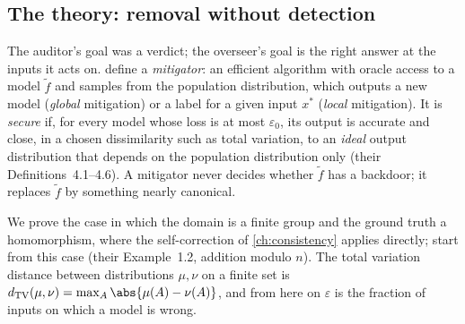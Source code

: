 \begin{refsection}
\section{The theory: removal without detection}\label{sec:backdoors:mitigation}

The auditor's goal was a verdict; the overseer's goal is the right answer at the inputs it acts on. \Textcite{GoldwasserEtAl2025} define a \emph{mitigator}: an efficient algorithm with oracle access to a model $\tilde f$ and samples from the population distribution, which outputs a new model (\emph{global} mitigation) or a label for a given input $x^*$ (\emph{local} mitigation). It is \emph{secure} if, for every model whose loss is at most $\varepsilon_0$, its output is accurate and close, in a chosen dissimilarity such as total variation, to an \emph{ideal} output distribution that depends on the population distribution only (their Definitions~4.1--4.6). A mitigator never decides whether $\tilde f$ has a backdoor; it replaces $\tilde f$ by something nearly canonical.

We prove the case in which the domain is a finite group and the ground truth a homomorphism, where the self-correction of \cref{ch:consistency} applies directly; \textcite{GoldwasserEtAl2025} start from this case (their Example~1.2, addition modulo $n$). The total variation distance between distributions $\mu,\nu$ on a finite set is $\backdoorsTV(\mu,\nu)=\max_A\abs{\mu(A)-\nu(A)}$, and from here on $\varepsilon$ is the fraction of inputs on which a model is wrong.


\end{refsection}
